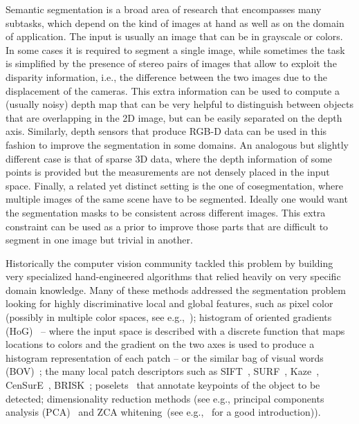 Semantic segmentation is a broad area of research that encompasses many
subtasks, which depend on the kind of images at hand as well as on the domain
of application. The input is usually an image that can be in grayscale or
colors.  In some cases it is required to segment a single image, while
sometimes the task is simplified by the presence of stereo pairs of images that
allow to exploit the disparity information, i.e., the difference between the
two images due to the displacement of the cameras. This extra information can
be used to compute a (usually noisy) depth map that can be very helpful to
distinguish between objects that are overlapping in the 2D image, but can be
easily separated on the depth axis. Similarly, depth sensors that produce RGB-D
data can be used in this fashion to improve the segmentation in some domains.
An analogous but slightly different case is that of sparse 3D data, where the
depth information of some points is provided but the measurements are not
densely placed in the input space.
Finally, a related yet distinct setting is the one of cosegmentation, where
multiple images of the same scene have to be segmented. Ideally one would want
the segmentation masks to be consistent across different images. This extra
constraint can be used as a prior to improve those parts that are difficult to
segment in one image but trivial in another.

Historically the computer vision community tackled this problem by building
very specialized hand-engineered algorithms that relied heavily on very
specific domain knowledge. Many of these methods addressed the segmentation
problem looking for highly discriminative local and global features, such as
pixel color (possibly in multiple color spaces, see e.g.,~\citep{
cheng2001color}); histogram of oriented gradients (HoG)~\citep{Dalal05,
bourdev2010detecting,felzenszwalb2010object} -- where the input space is
described with a discrete function that maps locations to colors and the
gradient on the two axes is used to produce a histogram representation of each
patch -- or the similar bag of visual words (BOV)~\citep{csurka2004visual}; the
many local patch descriptors such as SIFT~\citep{lowe2004distinctive},
SURF~\citep{bay2008speeded}, Kaze~\citep{alcantarilla2012kaze}, CenSurE~\citep{
agrawal2008censure}, BRISK~\citep{leutenegger2011brisk}; poselets~\citep{
brox2011object,bourdev2010detecting} that annotate keypoints of the object to
be detected; dimensionality reduction methods (see e.g., principal components
analysis (PCA)~\citep{smith2002tutorial,shlens2014tutorial,chen2011pixel} and
ZCA whitening~(see e.g.,~\citep{KrizhevskyHinton2009} for a good
introduction)).

